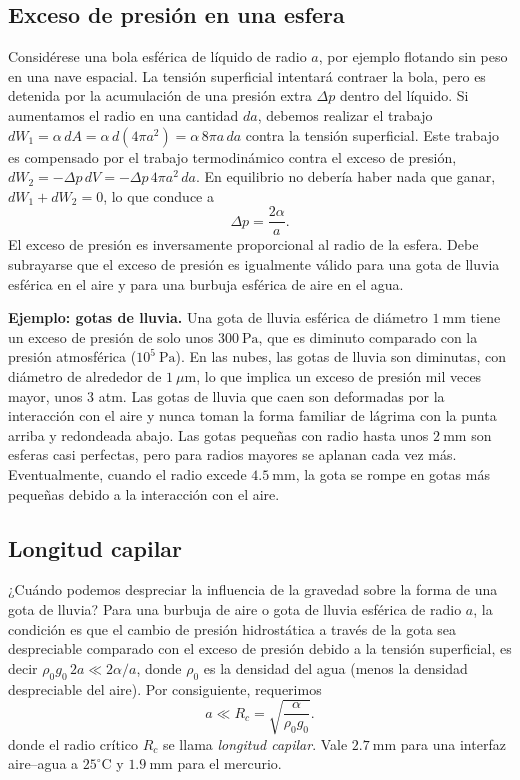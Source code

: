 \subsection{Exceso de presión en una esfera}

\figuraGotasLongitudCapilar

Considérese una bola esférica de líquido de radio $a$, por ejemplo flotando sin peso en una nave espacial. La tensión superficial intentará contraer la bola, pero es detenida por la acumulación de una presión extra $\Delta p$ dentro del líquido. Si aumentamos el radio en una cantidad $da$, debemos realizar el trabajo $dW_1 = \alpha\, dA = \alpha\, d(4\pi a^2) = \alpha\, 8\pi a\, da$ contra la tensión superficial. Este trabajo es compensado por el trabajo termodinámico contra el exceso de presión, $dW_2 = -\Delta p\, dV = -\Delta p\, 4\pi a^2\, da$. En equilibrio no debería haber nada que ganar, $dW_1 + dW_2 = 0$, lo que conduce a
$$ \Delta p = \frac{2\alpha}{a}. $$
El exceso de presión es inversamente proporcional al radio de la esfera. Debe subrayarse que el exceso de presión es igualmente válido para una gota de lluvia esférica en el aire y para una burbuja esférica de aire en el agua.

\textbf{Ejemplo: gotas de lluvia.} Una gota de lluvia esférica de diámetro $1\ \mathrm{mm}$ tiene un exceso de presión de solo unos $300\ \mathrm{Pa}$, que es diminuto comparado con la presión atmosférica ($10^5\ \mathrm{Pa}$). En las nubes, las gotas de lluvia son diminutas, con diámetro de alrededor de $1\ \mu\mathrm{m}$, lo que implica un exceso de presión mil veces mayor, unos 3 atm. Las gotas de lluvia que caen son deformadas por la interacción con el aire y nunca toman la forma familiar de lágrima con la punta arriba y redondeada abajo. Las gotas pequeñas con radio hasta unos $2\ \mathrm{mm}$ son esferas casi perfectas, pero para radios mayores se aplanan cada vez más. Eventualmente, cuando el radio excede $4.5\ \mathrm{mm}$, la gota se rompe en gotas más pequeñas debido a la interacción con el aire.

\subsection{Longitud capilar}

¿Cuándo podemos despreciar la influencia de la gravedad sobre la forma de una gota de lluvia? Para una burbuja de aire o gota de lluvia esférica de radio $a$, la condición es que el cambio de presión hidrostática a través de la gota sea despreciable comparado con el exceso de presión debido a la tensión superficial, es decir $\rho_0 g_0\, 2a \ll 2\alpha/a$, donde $\rho_0$ es la densidad del agua (menos la densidad despreciable del aire). Por consiguiente, requerimos
$$ a \ll R_c = \sqrt{\frac{\alpha}{\rho_0 g_0}}. $$
donde el radio crítico $R_c$ se llama \emph{longitud capilar}. Vale $2.7\ \mathrm{mm}$ para una interfaz aire--agua a $25^\circ\mathrm{C}$ y $1.9\ \mathrm{mm}$ para el mercurio.

